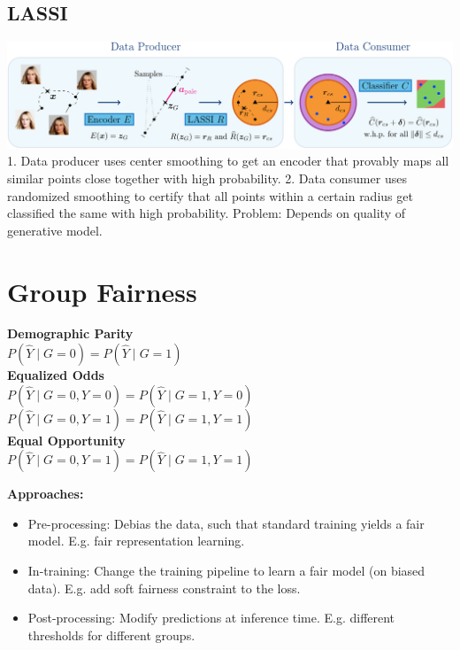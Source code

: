 \subsection*{LASSI}
\includegraphics[width=1\columnwidth]{img/lassi.png}
1. Data producer uses center smoothing to get an encoder that provably maps all similar points close together with high probability. 2. Data consumer uses randomized smoothing to certify that all points within a certain radius get classified the same with high probability. Problem: Depends on quality of generative model.

\section{Group Fairness}
\textbf{Demographic Parity}\\
$P(\hat Y\mid G=0)=P(\hat Y\mid G=1)$\\
\textbf{Equalized Odds}\\
$P(\hat Y\mid G=0,Y=0)=P(\hat Y\mid G=1,Y=0)$\\
$P(\hat Y\mid G=0,Y=1)=P(\hat Y\mid G=1,Y=1)$\\
\textbf{Equal Opportunity}\\
$P(\hat Y\mid G=0,Y=1)=P(\hat Y\mid G=1,Y=1)$

\textbf{Approaches:}
\begin{itemize}
    \item Pre-processing: Debias the data, such that standard training yields a fair model. E.g. fair representation learning.
    \item In-training: Change the training pipeline to learn a fair model (on biased data). E.g. add soft fairness constraint to the loss.
    \item Post-processing: Modify predictions at inference time. E.g. different thresholds for different groups.
\end{itemize}

